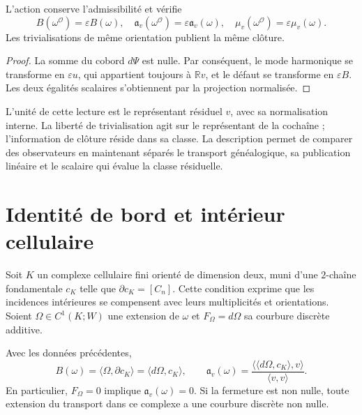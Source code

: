 \begin{proposition}
\label{x_reciprocidad:vii:prop:observador-covarianza}
L'action conserve l'admissibilité et vérifie
\[
 B(\omega^{\mathcal O})=\varepsilon B(\omega),\quad
 \mathfrak a_v(\omega^{\mathcal O})=\varepsilon\mathfrak a_v(\omega),
 \quad \mu_v(\omega^{\mathcal O})=\varepsilon\mu_v(\omega).
\]
Les trivialisations de même orientation publient la même clôture.
\end{proposition}

\begin{proof}
La somme du cobord \(d\Psi\) est nulle. Par conséquent, le mode harmonique
se transforme en \(\varepsilon u\), qui appartient toujours à
\(\mathbb Rv\), et le défaut se transforme en \(\varepsilon B\).
Les deux égalités scalaires s'obtiennent par la projection normalisée.
\end{proof}

L'unité de cette lecture est le représentant résiduel \(v\), avec sa normalisation interne. La liberté de trivialisation agit sur le représentant de la cochaîne ; l'information de clôture réside dans sa classe. La description permet de comparer des observateurs en maintenant séparés le transport généalogique, sa publication linéaire et le scalaire qui évalue la classe résiduelle.

\section{Identité de bord et intérieur cellulaire}
\label{x_reciprocidad:vii:sec:observador-stokes}

Soit \(K\) un complexe cellulaire fini orienté de dimension deux,
muni d'une \(2\)-chaîne fondamentale \(c_K\) telle que
\(\partial c_K=[C_n]\). Cette condition exprime que les incidences
intérieures se compensent avec leurs multiplicités et orientations.
Soient \(\Omega\in C^1(K;W)\) une extension de \(\omega\) et
\(F_\Omega=d\Omega\) sa courbure discrète additive.

\begin{theorem}
\label{x_reciprocidad:vii:thm:observador-stokes}
Avec les données précédentes,
\begin{equation}
 B(\omega)=\langle\Omega,\partial c_K\rangle
          =\langle d\Omega,c_K\rangle,
 \qquad
 \mathfrak a_v(\omega)
 =\frac{\langle\langle d\Omega,c_K\rangle,v\rangle}
        {\langle v,v\rangle}.
 \label{x_reciprocidad:vii:eq:observador-stokes}
\end{equation}
En particulier, \(F_\Omega=0\) implique \(\mathfrak a_v(\omega)=0\).
Si la fermeture est non nulle, toute extension du transport dans ce complexe
a une courbure discrète non nulle.
\end{theorem}

